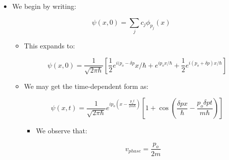 \begin{itemize}
\begin{itemize}
\begin{itemize}
        \end{itemize}

      \item We begin by writing:

        $$\psi(x,0)=\sum_{j}c_j\phi_{p_j}(x)$$

        \begin{itemize}

          \item This expands to:

            $$\psi(x,0)=\frac{1}{\sqrt{2\pi\hbar}}\left[ \frac{1}{2}e^{i(p_o-\delta p}x/\hbar+e^{ip_ox/\hbar}+\frac{1}{2}e^{i(p_o+\delta p)x/\hbar} \right]$$
          \item We may get the time-dependent form as:

            $$\psi(x,t)=\frac{1}{\sqrt{2\pi\hbar}}e^{ip_o\left( x-\frac{p_ot}{2m\hbar} \right)}\left[ 1+\cos\left( \frac{\delta p x}{\hbar}-\frac{p_o\delta pt}{m\hbar} \right) \right]$$

            \begin{itemize}

              \item We observe that:

                $$v_{phase}=\frac{p_o}{2m}$$

            \end{itemize}

        \end{itemize}

    \end{itemize}

\end{itemize}



